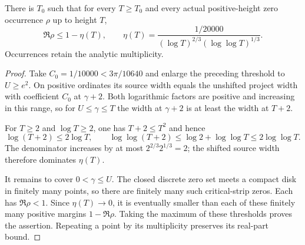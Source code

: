 \begin{theorem}
\label{analytic:uniform-zero-width}
\leanok
There is $T_0$ such that for every $T\ge T_0$ and every actual
positive-height zero occurrence $\rho$ up to height $T$,
\[
 \Re\rho\le1-\eta(T),\qquad
 \eta(T)=
 \frac{1/20000}{(\log T)^{2/3}(\log\log T)^{1/3}}.
\]
Occurrences retain the analytic multiplicity.
\end{theorem}
\begin{proof}
Take $C_0=1/10000<3\pi/10640$ and enlarge the preceding threshold
to $U\ge e^2$.
On positive ordinates its source width equals the unshifted project
width with coefficient $C_0$ at $\gamma+2$.
Both logarithmic factors are positive and increasing in this range,
so for $U\le\gamma\le T$ the width at $\gamma+2$ is at least
the width at $T+2$.

For $T\ge2$ and $\log T\ge2$, one has $T+2\le T^2$ and hence
\[
 \log(T+2)\le2\log T,\qquad
 \log\log(T+2)\le\log2+\log\log T\le2\log\log T.
\]
The denominator increases by at most
$2^{2/3}2^{1/3}=2$; the shifted source width therefore dominates
$\eta(T)$.

It remains to cover $0<\gamma\le U$.
The closed discrete zero set meets a compact disk in finitely many
points, so there are finitely many such critical-strip zeros.
Each has $\Re\rho<1$.
Since $\eta(T)\to0$, it is eventually smaller than each of these
finitely many positive margins $1-\Re\rho$.
Taking the maximum of these thresholds proves the assertion.
Repeating a point by its multiplicity preserves its real-part bound.
\end{proof}

